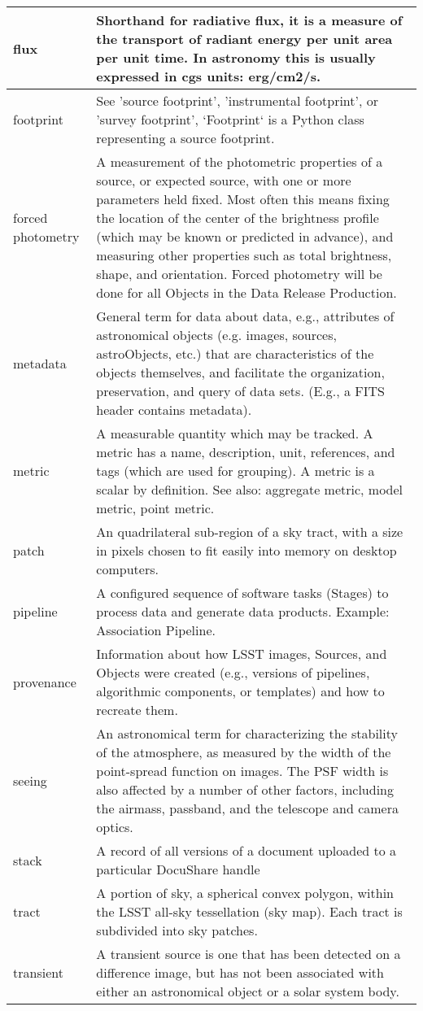 \begin{longtable}{|l|p{}|}
flux & Shorthand for radiative flux, it is a measure of the transport of radiant energy per unit area per unit time. In astronomy this is usually expressed in cgs units: erg/cm2/s. \\\hline
footprint & See 'source footprint', 'instrumental footprint', or 'survey footprint', `Footprint` is a Python class representing a source footprint. \\\hline
forced photometry & A measurement of the photometric properties of a source, or expected source, with one or more parameters held fixed. Most often this means fixing the location of the center of the brightness profile (which may be known or predicted in advance), and measuring other properties such as total brightness, shape, and orientation. Forced photometry will be done for all Objects in the Data Release Production. \\\hline
metadata & General term for data about data, e.g., attributes of astronomical objects (e.g. images, sources, astroObjects, etc.) that are characteristics of the objects themselves, and facilitate the organization, preservation, and query of data sets. (E.g., a FITS header contains metadata). \\\hline
metric & A measurable quantity which may be tracked. A metric has a name, description, unit, references, and tags (which are used for grouping). A metric is a scalar by definition. See also: aggregate metric, model metric, point metric. \\\hline
patch & An quadrilateral sub-region of a sky tract, with a size in pixels chosen to fit easily into memory on desktop computers. \\\hline
pipeline & A configured sequence of software tasks (Stages) to process data and generate data products. Example: Association Pipeline. \\\hline
provenance & Information about how LSST images, Sources, and Objects were created (e.g., versions of pipelines, algorithmic components, or templates) and how to recreate them. \\\hline
seeing & An astronomical term for characterizing the stability of the atmosphere, as measured by the width of the point-spread function on images. The PSF width is also affected by a number of other factors, including the airmass, passband, and the telescope and camera optics. \\\hline
stack & A record of all versions of a document uploaded to a particular DocuShare handle \\\hline
tract & A portion of sky, a spherical convex polygon, within the LSST all-sky tessellation (sky map). Each tract is subdivided into sky patches. \\\hline
transient & A transient source is one that has been detected on a difference image, but has not been associated with either an astronomical object or a solar system body. \\\hline
\end{longtable}
